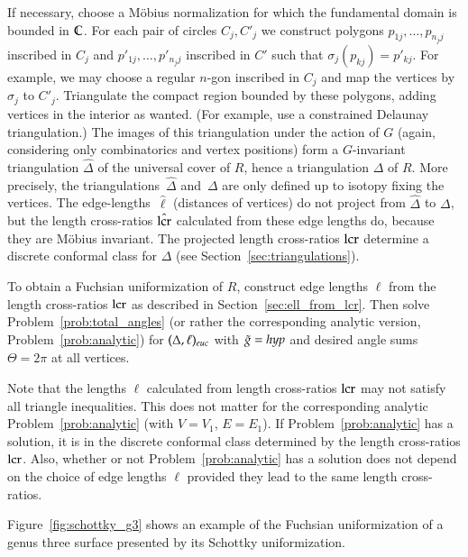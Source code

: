 \documentclass[Thesis]{subfiles}
\begin{document}
If necessary, choose a M{\"o}bius normalization for which the
fundamental domain is bounded in $\mathbb C$. For each pair of circles
$C_{j}, C'_{j}$ we construct polygons $p_{1j},\ldots,p_{n_{j}j}$
inscribed in $C_{j}$ and $p'_{1j},\ldots,p'_{n_{j}j}$ inscribed in
$C'$ such that $\sigma_{j}(p_{kj})=p'_{kj}$. For example, we may
choose a regular $n$-gon inscribed in $C_{j}$ and map the vertices by
$\sigma_{j}$ to $C'_{j}$.  Triangulate the compact region bounded by
these polygons, adding vertices in the interior as wanted. (For
example, use a constrained Delaunay triangulation.) The images of this
triangulation under the action of $G$ (again, considering only
combinatorics and vertex positions) form a $G$-invariant triangulation
$\hat\Delta$ of the universal cover of $R$, hence a triangulation
$\Delta$ of $R$. More precisely, the triangulations~$\hat\Delta$
and~$\Delta$ are only defined up to isotopy fixing the vertices. The
edge-lengths~$\hat\ell$ (distances of vertices) do not project from
$\hat\Delta$ to $\Delta$, but the length cross-ratios $\hat{\operatorname{lcr}}$
calculated from these edge lengths do, because they are M{\"o}bius
invariant. The projected length cross-ratios $\operatorname{lcr}$ determine a
discrete conformal class for $\Delta$ (see
Section~\ref{sec:triangulations}).

To obtain a Fuchsian uniformization of $R$, construct edge lengths
$\ell$ from the length cross-ratios $\operatorname{lcr}$ as described in
Section~\ref{sec:ell_from_lcr}. Then solve
Problem~\ref{prob:total_angles} (or rather the corresponding analytic
version, Problem~\ref{prob:analytic}) for $(\Delta,\ell)_{\euc}$ with
$\tilde{g}=\mathit{hyp}$ and desired angle sums $\Theta=2\pi$ at all vertices.

Note that the lengths $\ell$ calculated from length cross-ratios
$\operatorname{lcr}$ may not satisfy all triangle inequalities. This does not matter
for the corresponding analytic Problem~\ref{prob:analytic} (with
$V=V_{1}$, $E=E_{1}$). If Problem~\ref{prob:analytic} has a solution,
it is in the discrete conformal class determined by the length
cross-ratios $\operatorname{lcr}$. Also, whether or not Problem~\ref{prob:analytic}
has a solution does not depend on the choice of edge lengths $\ell$
provided they lead to the same length cross-ratios.

Figure~\ref{fig:schottky_g3} shows an example of the Fuchsian
uniformization of a genus three surface presented by its Schottky
uniformization. 
\end{document}
